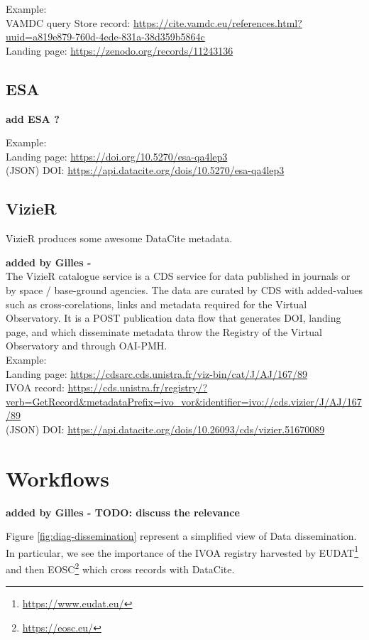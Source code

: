 \documentclass[11pt,a4paper]{ivoa}
\begin{document}
Example:\\
VAMDC query Store record: \url{https://cite.vamdc.eu/references.html?uuid=a819e879-760d-4ede-831a-38d359b5864c}\\
Landing page: \url{https://zenodo.org/records/11243136}

\subsection{ESA}
\textbf{\color{red}  add ESA ?}

Example:\\
Landing page: \url{https://doi.org/10.5270/esa-qa4lep3}\\
(JSON) DOI: \url{https://api.datacite.org/dois/10.5270/esa-qa4lep3}

\subsection{VizieR}
VizieR produces some awesome DataCite metadata.


\textbf{\color{red} added by Gilles - }\\

The VizieR  catalogue service is a CDS service for data published in journals or by space / base-ground agencies. The data are curated by CDS with added-values such as cross-corelations, links and metadata required for the Virtual Observatory. It is a POST publication data flow that generates DOI, landing page, and which disseminate metadata throw the Registry of the Virtual Observatory and through OAI-PMH.\\


Example:\\
Landing page: \url{https://cdsarc.cds.unistra.fr/viz-bin/cat/J/AJ/167/89}\\
IVOA record: \url{https://cds.unistra.fr/registry/?verb=GetRecord&metadataPrefix=ivo_vor&identifier=ivo://cds.vizier/J/AJ/167/89}\\
(JSON) DOI: \url{https://api.datacite.org/dois/10.26093/cds/vizier.51670089}

\section{Workflows}
\textbf{\color{red} added by Gilles - TODO: discuss the relevance}

Figure \ref{fig:diag-dissemination} represent a simplified view of Data dissemination.
In particular, we see the importance of the IVOA registry harvested by EUDAT\footnote{\url{https://www.eudat.eu/}} and then EOSC\footnote{\url{https://eosc.eu/}} which cross records with DataCite.
\end{document}

